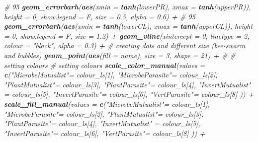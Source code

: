 \documentclass[
]{article}
\newenvironment{Shaded}{\begin{snugshade}}{\end{snugshade}}
\newcommand{\CommentTok}[1]{\textcolor[rgb]{0.56,0.35,0.01}{\textit{#1}}}
\newcommand{\DataTypeTok}[1]{\textcolor[rgb]{0.13,0.29,0.53}{#1}}
\newcommand{\DecValTok}[1]{\textcolor[rgb]{0.00,0.00,0.81}{#1}}
\newcommand{\FloatTok}[1]{\textcolor[rgb]{0.00,0.00,0.81}{#1}}
\newcommand{\KeywordTok}[1]{\textcolor[rgb]{0.13,0.29,0.53}{\textbf{#1}}}
\newcommand{\NormalTok}[1]{#1}
\newcommand{\OperatorTok}[1]{\textcolor[rgb]{0.81,0.36,0.00}{\textbf{#1}}}
\newcommand{\StringTok}[1]{\textcolor[rgb]{0.31,0.60,0.02}{#1}}
\begin{document}
\begin{Shaded}
\begin{Highlighting}[]
{{{\StringTok{  }\CommentTok{# 95 %
\StringTok{  }\KeywordTok{geom_errorbarh}\NormalTok{(}\KeywordTok{aes}\NormalTok{(}\DataTypeTok{xmin =} \KeywordTok{tanh}\NormalTok{(lowerPR), }\DataTypeTok{xmax =} \KeywordTok{tanh}\NormalTok{(upperPR)),  }\DataTypeTok{height =} \DecValTok{0}\NormalTok{, }\DataTypeTok{show.legend =}\NormalTok{ F, }\DataTypeTok{size =} \FloatTok{0.5}\NormalTok{, }\DataTypeTok{alpha =} \FloatTok{0.6}\NormalTok{) }\OperatorTok{+}
\StringTok{  }\CommentTok{# 95 %
\StringTok{  }\KeywordTok{geom_errorbarh}\NormalTok{(}\KeywordTok{aes}\NormalTok{(}\DataTypeTok{xmin =} \KeywordTok{tanh}\NormalTok{(lowerCL), }\DataTypeTok{xmax =} \KeywordTok{tanh}\NormalTok{(upperCL)),  }\DataTypeTok{height =} \DecValTok{0}\NormalTok{, }\DataTypeTok{show.legend =}\NormalTok{ F, }\DataTypeTok{size =} \FloatTok{1.2}\NormalTok{) }\OperatorTok{+}
\StringTok{  }\KeywordTok{geom_vline}\NormalTok{(}\DataTypeTok{xintercept =} \DecValTok{0}\NormalTok{, }\DataTypeTok{linetype =} \DecValTok{2}\NormalTok{, }\DataTypeTok{colour =} \StringTok{"black"}\NormalTok{, }\DataTypeTok{alpha =} \FloatTok{0.3}\NormalTok{) }\OperatorTok{+}
\StringTok{  }\CommentTok{# creating dots and different size (bee-swarm and bubbles)}
\StringTok{  }\KeywordTok{geom_point}\NormalTok{(}\KeywordTok{aes}\NormalTok{(}\DataTypeTok{fill =}\NormalTok{ name), }\DataTypeTok{size =} \DecValTok{3}\NormalTok{, }\DataTypeTok{shape =} \DecValTok{21}\NormalTok{) }\OperatorTok{+}\StringTok{ }\CommentTok{#}
\StringTok{  }\CommentTok{# setting colours}
\StringTok{  }\CommentTok{# setting colours}
\StringTok{  }\KeywordTok{scale_color_manual}\NormalTok{(}\DataTypeTok{values =}   \KeywordTok{c}\NormalTok{(}\StringTok{"MicrobeMutualist"}\NormalTok{=}\StringTok{ }\NormalTok{colour_ls[}\DecValTok{1}\NormalTok{], }\StringTok{"MicrobeParasite"}\NormalTok{=}\StringTok{ }\NormalTok{colour_ls[}\DecValTok{2}\NormalTok{],  }\StringTok{"PlantMutualist"}\NormalTok{=}\StringTok{ }\NormalTok{colour_ls[}\DecValTok{3}\NormalTok{], }\StringTok{"PlantParasite"}\NormalTok{=}\StringTok{ }\NormalTok{colour_ls[}\DecValTok{4}\NormalTok{], }\StringTok{"InvertMutualist"}\NormalTok{ =}\StringTok{ }\NormalTok{colour_ls[}\DecValTok{5}\NormalTok{],  }\StringTok{"InvertParasite"}\NormalTok{=}\StringTok{ }\NormalTok{colour_ls[}\DecValTok{6}\NormalTok{], }\StringTok{"VertParasite"}\NormalTok{=}\StringTok{ }\NormalTok{colour_ls[}\DecValTok{8}\NormalTok{] )) }\OperatorTok{+}
\StringTok{  }\KeywordTok{scale_fill_manual}\NormalTok{(}\DataTypeTok{values =} \KeywordTok{c}\NormalTok{(}\StringTok{"MicrobeMutualist"}\NormalTok{=}\StringTok{ }\NormalTok{colour_ls[}\DecValTok{1}\NormalTok{], }\StringTok{"MicrobeParasite"}\NormalTok{=}\StringTok{ }\NormalTok{colour_ls[}\DecValTok{2}\NormalTok{],  }\StringTok{"PlantMutualist"}\NormalTok{=}\StringTok{ }\NormalTok{colour_ls[}\DecValTok{3}\NormalTok{], }\StringTok{"PlantParasite"}\NormalTok{=}\StringTok{ }\NormalTok{colour_ls[}\DecValTok{4}\NormalTok{], }\StringTok{"InvertMutualist"}\NormalTok{ =}\StringTok{ }\NormalTok{colour_ls[}\DecValTok{5}\NormalTok{],  }\StringTok{"InvertParasite"}\NormalTok{=}\StringTok{ }\NormalTok{colour_ls[}\DecValTok{6}\NormalTok{], }\StringTok{"VertParasite"}\NormalTok{=}\StringTok{ }\NormalTok{colour_ls[}\DecValTok{8}\NormalTok{] )) }\OperatorTok{+}
}}}}}
\end{Highlighting}
\end{Shaded}
\end{document}
